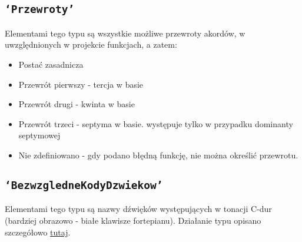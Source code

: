 \documentclass[dokumentacja.tex]{subfiles}
\begin{document}
\subsection{\texttt{`Przewroty'}}
Elementami tego typu są wszystkie możliwe przewroty akordów, w uwzględnionych w projekcie funkcjach, a zatem: 
\begin{itemize}
    \item Postać zasadnicza 
    \item Przewrót pierwszy - tercja w basie
    \item Przewrót drugi - kwinta w basie
    \item Przewrót trzeci - septyma w basie. występuje tylko w przypadku dominanty septymowej
    \item Nie zdefiniowano - gdy podano błędną funkcję, nie można określić przewrotu.
\end{itemize} 

\subsection{\texttt{`BezwzgledneKodyDzwiekow'}}
Elementami tego typu są nazwy dźwięków występujących w tonacji C-dur (bardziej obrazowo - białe klawisze fortepianu). Działanie typu opisano szczegółowo \hyperref[punkt:bezwzglednyKodDzwieku]{tutaj}. 
\end{document}
